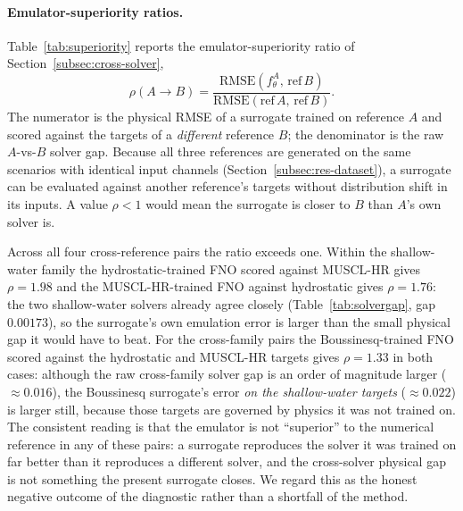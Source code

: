 \paragraph{Emulator-superiority ratios.}
Table~\ref{tab:superiority} reports the emulator-superiority ratio of Section~\ref{subsec:cross-solver},
\[
    \rho(A \rightarrow B) =
    \frac{\mathrm{RMSE}(f_\theta ^ A,\, \mathrm{ref}\, B)}
         {\mathrm{RMSE}(\mathrm{ref}\, A,\, \mathrm{ref}\, B)} .
\]
The numerator is the physical RMSE of a surrogate trained on reference $A$ and scored against the targets of a \emph{different} reference $B$; the denominator is the raw $A$-vs-$B$ solver gap. Because all three references are generated on the same scenarios with identical input channels (Section~\ref{subsec:res-dataset}), a surrogate can be evaluated against another reference's targets without distribution shift in its inputs. A value $\rho<1$ would mean the surrogate is closer to $B$ than $A$'s own solver is.

Across all four cross-reference pairs the ratio exceeds one. Within the shallow-water family the hydrostatic-trained FNO scored against MUSCL-HR gives $\rho = 1.98$ and the MUSCL-HR-trained FNO against hydrostatic gives $\rho = 1.76$: the two shallow-water solvers already agree closely (Table~\ref{tab:solvergap}, gap $0.00173$), so the surrogate's own emulation error is larger than the small physical gap it would have to beat. For the cross-family pairs the Boussinesq-trained FNO scored against the hydrostatic and MUSCL-HR targets gives $\rho=1.33$ in both cases: although the raw cross-family solver gap is an order of magnitude larger ($\approx 0.016$), the Boussinesq surrogate's error \emph{on the shallow-water targets} ($\approx 0.022$) is larger still, because those targets are governed by physics it was not trained on. The consistent reading is that the emulator is not ``superior'' to the numerical reference in any of these pairs: a surrogate reproduces the solver it was trained on far better than it reproduces a different solver, and the cross-solver physical gap is not something the present surrogate closes. We regard this as the honest negative outcome of the diagnostic rather than a shortfall of the method.

